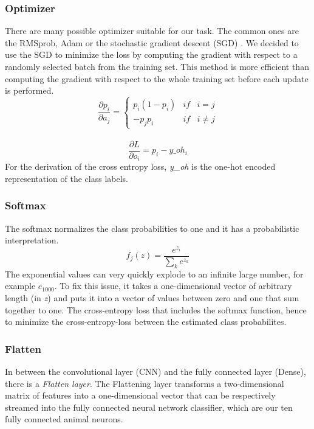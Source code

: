 \documentclass[journal]{IEEEtran}
\begin{document}
\subsubsection{Optimizer}
\noindent There are many possible optimizer suitable for our task. The common ones are the RMSprob, Adam or the stochastic gradient descent (SGD) \cite{RN1}. We decided to use the SGD to minimize the loss by computing the gradient with respect to a randomly selected batch from the training set. This method is more efficient than computing the gradient with respect to the whole training set before each update is performed.
\begin{equation}
\frac{\partial p_i}{\partial a_j}=\left\{\begin{matrix} p_i(1-p_i) & if & i=j\\ -p_j p_i & if & i\neq j \end{matrix}\right.
\end{equation} \\
\begin{equation}
\frac{\partial L}{\partial o_i}=p_i-y\_oh_i
\end{equation} 
For the derivation of the cross entropy loss, \textit{y\_oh} is the one-hot encoded representation of the class labels.
\subsubsection{Softmax}
\noindent The softmax normalizes the class probabilities to one and it has a probabilistic interpretation. 
\begin{equation}
f_{j}(z) = \frac{e^{z_{i}}}{\sum_{k} e^{z_{k}}}
\end{equation}
The exponential values can very quickly explode to an infinite large number, for example \(e_{1000}\). To fix this issue, it takes a one-dimensional vector of arbitrary length (in \textit{z}) and puts it into a vector of values between zero and one that sum together to one. The cross-entropy loss that includes the softmax function, hence to minimize the cross-entropy-loss between the estimated class probabilites. \\
\subsubsection{Flatten}
In between the convolutional layer (CNN) and the fully connected layer (Dense), there is a \textit{Flatten layer}. The Flattening layer transforms a two-dimensional matrix of features into a one-dimensional vector that can be respectively streamed into the fully connected neural network classifier, which are our ten fully connected animal neurons. \\
%
%
\end{document}
